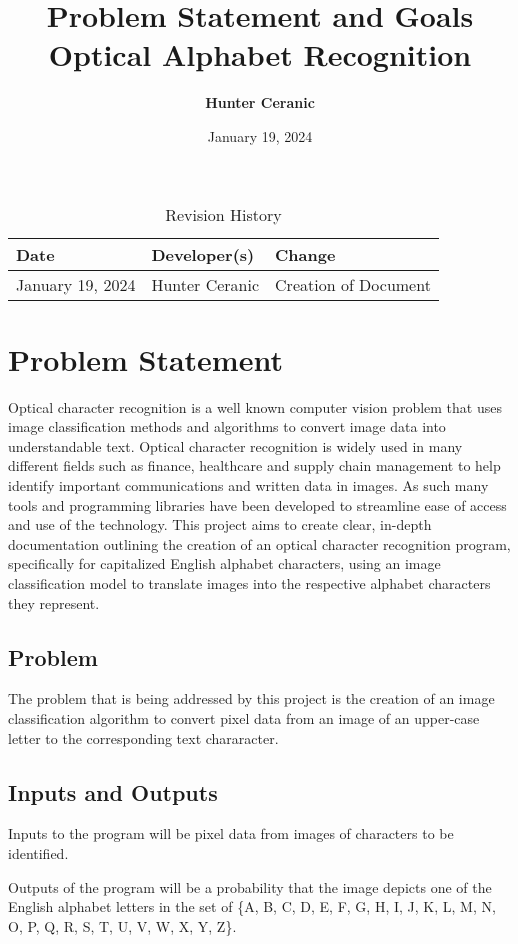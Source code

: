 \documentclass{article}
\title{Problem Statement and Goals\\Optical Alphabet Recognition}
\author{\textbf{Hunter Ceranic}}
\date{January 19, 2024}
\begin{document}
\maketitle

\begin{table}[hp]
\caption{Revision History} \label{TblRevisionHistory}
\begin{tabularx}{\textwidth}{llX}
\toprule
\textbf{Date} & \textbf{Developer(s)} & \textbf{Change}\\
\midrule
January 19, 2024 & Hunter Ceranic & Creation of Document\\
\bottomrule
\end{tabularx}
\end{table}

\section{Problem Statement}
Optical character recognition is a well known computer vision problem that uses image classification methods and algorithms to
convert image data into understandable text. Optical character recognition is widely used in many different fields such as 
finance, healthcare and supply chain management to help identify important communications and written data in images. 
As such many tools and programming libraries have been developed to streamline ease of access and use of the technology. 
This project aims to create clear, in-depth documentation outlining the creation of an optical character recognition program,
specifically for capitalized English alphabet characters, using an image classification model to translate images into the 
respective alphabet characters they represent.

\subsection{Problem}
The problem that is being addressed by this project is the creation of an image classification algorithm to convert 
pixel data from an image of an upper-case letter to the corresponding text chararacter.
\subsection{Inputs and Outputs}
Inputs to the program will be pixel data from images of characters to be identified.

Outputs of the program will be a probability that the image depicts one of the English alphabet letters in the 
set of \{A, B, C, D, E, F, G, H, I, J, K, L, M, N, O, P, Q, R, S, T, U, V, W, X, Y, Z\}.
\end{document}
